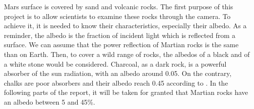 Mars surface is covered by sand and volcanic rocks. The first purpose of this project is to allow scientists to examine these rocks through the camera. To achieve it, it is needed to know their characteristics, especially their albedo. As a reminder, the albedo is the fraction of incident light which is reflected from a surface. We can assume that the power reflection of Martian rocks is the same than on Earth. Then, to cover a wild range of rocks, the albedos of a black and of a white stone would be considered. Charcoal, as a dark rock, is a powerful absorber of the sun radiation, with an albedo around 0.05. On the contrary, chalks are poor absorbers and their albedo reach 0.45 according to \cite{albedo}. In the following parts of the report, it will be taken for granted that Martian rocks have an albedo between 5 and 45\%.
